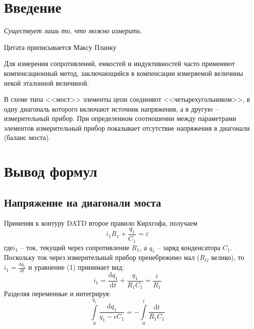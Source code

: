 \documentclass[a4paper,12pt]{extarticle}
\def\source{/home/osabio/tex/templates}
\begin{document}

\tableofcontents
\newpage

\section*{Введение} %
\label{sec:input}
\epigraph{\textit{Существует лишь то, что можно измерить.}}
{Цитата приписывается Максу Планку}




 Для измерения сопротивлений, емкостей и индуктивностей  часто  применяют
компенсационный метод, заключающийся в компенсации измеряемой величины некой эталонной величиной. 

В схеме типа <<мост>> элементы цепи соединяют  <<четырехугольником>>, в одну диагональ  которого  включают  источник  напряжения,  а  в  другую  --
измерительный  прибор.  При  определенном  соотношении   между   параметрами
элементов измерительный прибор показывает отсутствие напряжения в  диагонали
(баланс моста).


\newpage
\section{Вывод формул}
\subsection{Напряжение на диагонали моста}

Применяя к контуру DATD второе правило Кирхгофа, получаем
\begin{equation}
i_1 R_1 + \frac{q_1}{C_1}=\varepsilon
\end{equation}
где$ i_1$ -- ток, текущий через сопротивление $R_1$, а $q_1$ -- заряд конденсатора $C_1$. 
Поскольку ток через измерительный прибор пренебрежимо мал ($R_G$ велико), то $i_1=\frac{\mathrm{d}q_1 }{\mathrm{d} t}$ и уравнение (1) принимает вид:
\begin{equation}
i_1=\frac{\mathrm{d}q_1 }{\mathrm{d} t} + \frac{q_1}{R_1 C_1}=\frac{\varepsilon}{R_1}
\end{equation}
Разделяя переменные и интегрируя:
\begin{equation}
 \int \limits^{q_1}_0 \frac{\mathrm{d} q_1}{q_1-\epsilon C_1}=-\int \limits^t_0 \frac{\mathrm{d} t}{R_1 C_1}
\end{equation}
\end{document}
